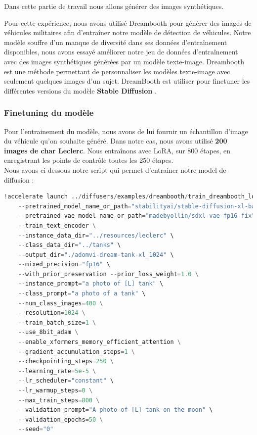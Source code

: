 Dans cette partie de travail nous allons générer des images synthétiques.

Pour cette expérience, nous avons utilisé Dreambooth \cite{ruiz2023dreambooth} pour générer des images de véhicules militaires afin d'entraîner notre modèle de détection de véhicules.
Notre modèle souffre d'un manque de diversité dans ses données d'entraînement disponibles, nous avons essayé améliorer notre jeu de données d'entraînement avec des images synthétiques générées par un modèle texte-image.
Dreambooth est une méthode permettant de personnaliser les modèles texte-image avec seulement quelques images d'un sujet.
DreamBooth est utiliser pour finetuner les différentes versions du modèle \textbf{Stable Diffusion} \cite{rombach2021highresolution}.\\

\subsubsection{Finetuning du modèle}

Pour l'entrainement du modèle, nous avons de lui fournir un échantillon d'image du véhicule qu'on souhaite généré.
Dans notre cas, nous avons utilisé \textbf{200 images de char Leclerc}.
Nous entraînons avec LoRA, sur 800 étapes, en enregistrant les points de contrôle toutes les 250 étapes.\\

Nous avons ci dessous notre script qui permet d'entrainer notre model de diffusion :

\lstset{style=mystyle}

\begin{lstlisting}[language=Python, basicstyle=\footnotesize\ttfamily, breaklines=false]
!accelerate launch ../diffusers/examples/dreambooth/train_dreambooth_lora_sdxl.py \
    --pretrained_model_name_or_path="stabilityai/stable-diffusion-xl-base-1.0" \
    --pretrained_vae_model_name_or_path="madebyollin/sdxl-vae-fp16-fix" \
    --train_text_encoder \
    --instance_data_dir="../resources/leclerc" \
    --class_data_dir="../tanks" \
    --output_dir="./adomvi-dream-tank-xl_1024" \
    --mixed_precision="fp16" \
    --with_prior_preservation --prior_loss_weight=1.0 \
    --instance_prompt="a photo of [L] tank" \
    --class_prompt="a photo of a tank" \
    --num_class_images=400 \
    --resolution=1024 \
    --train_batch_size=1 \
    --use_8bit_adam \
    --enable_xformers_memory_efficient_attention \
    --gradient_accumulation_steps=1 \
    --checkpointing_steps=250 \
    --learning_rate=5e-5 \
    --lr_scheduler="constant" \
    --lr_warmup_steps=0 \
    --max_train_steps=800 \
    --validation_prompt="A photo of [L] tank on the moon" \
    --validation_epochs=50 \
    --seed="0"
\end{lstlisting}

